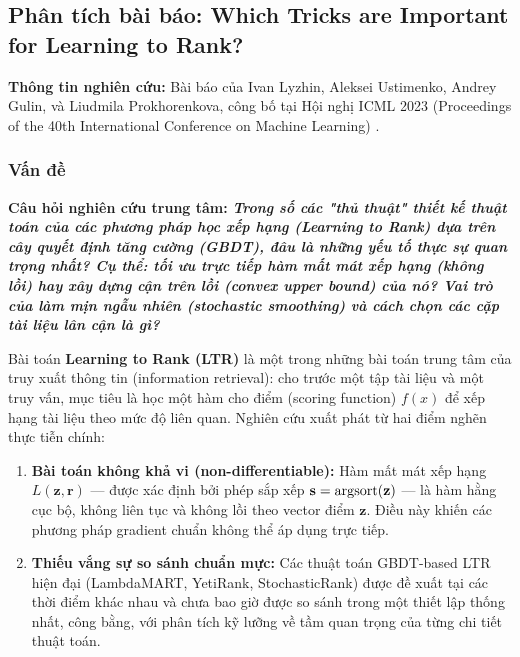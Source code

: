 \subsection{Phân tích bài báo: Which Tricks are Important for Learning to Rank?}
\textbf{Thông tin nghiên cứu:} Bài báo của Ivan Lyzhin, Aleksei Ustimenko, Andrey Gulin, và Liudmila Prokhorenkova, công bố tại Hội nghị ICML 2023 (Proceedings of the 40th International Conference on Machine Learning) \citep{lyzhin2023tricks}.

\subsubsection{Vấn đề}

\begin{tcolorbox}\textbf{Câu hỏi nghiên cứu trung tâm:}\bfseries
  \textit{Trong số các "thủ thuật" thiết kế thuật toán của các phương pháp học xếp hạng (Learning to Rank) dựa trên cây quyết định tăng cường (GBDT), đâu là những yếu tố thực sự quan trọng nhất? Cụ thể: tối ưu trực tiếp hàm mất mát xếp hạng (không lồi) hay xây dựng cận trên lồi (convex upper bound) của nó? Vai trò của làm mịn ngẫu nhiên (stochastic smoothing) và cách chọn các cặp tài liệu lân cận là gì?}
\end{tcolorbox}
\medskip

Bài toán \textbf{Learning to Rank (LTR)} là một trong những bài toán trung tâm của truy xuất thông tin (information retrieval): cho trước một tập tài liệu và một truy vấn, mục tiêu là học một hàm cho điểm (scoring function) $f(x)$ để xếp hạng tài liệu theo mức độ liên quan. Nghiên cứu xuất phát từ hai điểm nghẽn thực tiễn chính:

\begin{enumerate}
  \item \textbf{Bài toán không khả vi (non-differentiable):} Hàm mất mát xếp hạng $L(\mathbf{z}, \mathbf{r})$ --- được xác định bởi phép sắp xếp $\mathbf{s} = \arg\!\operatorname{sort}(\mathbf{z})$ --- là hàm hằng cục bộ, không liên tục và không lồi theo vector điểm $\mathbf{z}$. Điều này khiến các phương pháp gradient chuẩn không thể áp dụng trực tiếp.
  \item \textbf{Thiếu vắng sự so sánh chuẩn mực:} Các thuật toán GBDT-based LTR hiện đại (LambdaMART, YetiRank, StochasticRank) được đề xuất tại các thời điểm khác nhau và chưa bao giờ được so sánh trong một thiết lập thống nhất, công bằng, với phân tích kỹ lưỡng về tầm quan trọng của từng chi tiết thuật toán.
\end{enumerate}

